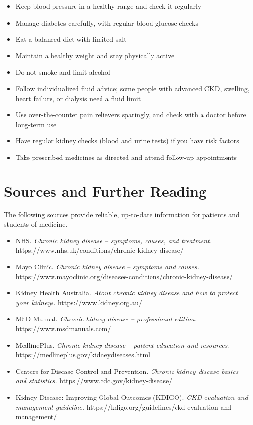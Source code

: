 \begin{itemize}
    \item Keep blood pressure in a healthy range and check it regularly
    \item Manage diabetes carefully, with regular blood glucose checks
    \item Eat a balanced diet with limited salt
    \item Maintain a healthy weight and stay physically active
    \item Do not smoke and limit alcohol
    \item Follow individualized fluid advice; some people with advanced CKD, swelling, heart failure, or dialysis need a fluid limit
    \item Use over-the-counter pain relievers sparingly, and check with a doctor before long-term use
    \item Have regular kidney checks (blood and urine tests) if you have risk factors
    \item Take prescribed medicines as directed and attend follow-up appointments
\end{itemize}

\section*{Sources and Further Reading}
The following sources provide reliable, up-to-date information for patients and students of medicine.

\begin{itemize}
    \item NHS. \textit{Chronic kidney disease -- symptoms, causes, and treatment.} https://www.nhs.uk/conditions/chronic-kidney-disease/
    \item Mayo Clinic. \textit{Chronic kidney disease -- symptoms and causes.} https://www.mayoclinic.org/diseases-conditions/chronic-kidney-disease/
    \item Kidney Health Australia. \textit{About chronic kidney disease and how to protect your kidneys.} https://www.kidney.org.au/
    \item MSD Manual. \textit{Chronic kidney disease -- professional edition.} https://www.msdmanuals.com/
    \item MedlinePlus. \textit{Chronic kidney disease -- patient education and resources.} https://medlineplus.gov/kidneydiseases.html
    \item Centers for Disease Control and Prevention. \textit{Chronic kidney disease basics and statistics.} https://www.cdc.gov/kidney-disease/
    \item Kidney Disease: Improving Global Outcomes (KDIGO). \textit{CKD evaluation and management guideline.} https://kdigo.org/guidelines/ckd-evaluation-and-management/
\end{itemize}
